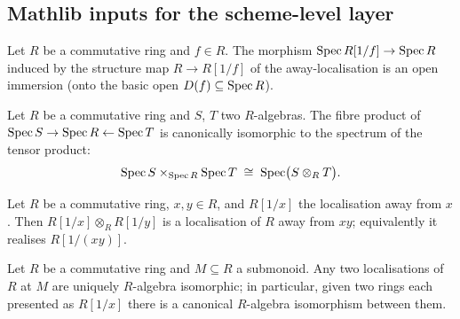 \subsection*{Mathlib inputs for the scheme-level layer}

\begin{lemma}
  \label{mk-lem:mathlib_specMap_localizationAway_isOpenImmersion}
  \mathlibok

  Let \(R\) be a commutative ring and \(f \in R\). The morphism
  \(\operatorname{Spec} R[1/f] \to \operatorname{Spec} R\) induced by the structure map \(R \to R[1/f]\) of
  the away-localisation is an open immersion (onto the basic open
  \(D(f) \subseteq \operatorname{Spec} R\)).
\end{lemma}

\begin{lemma}
  \label{mk-lem:mathlib_pullbackSpecIso}
  \mathlibok

  Let \(R\) be a commutative ring and \(S\), \(T\) two \(R\)-algebras. The fibre
  product of \(\operatorname{Spec} S \to \operatorname{Spec} R \leftarrow \operatorname{Spec} T\) is canonically isomorphic
  to the spectrum of the tensor product:
  \[
    \operatorname{Spec} S \times_{\operatorname{Spec} R} \operatorname{Spec} T \;\cong\; \operatorname{Spec}\bigl(S \otimes_R T\bigr).
  \]
\end{lemma}

\begin{lemma}
  \label{mk-lem:mathlib_isLocalization_away_mul}
  \mathlibok

  Let \(R\) be a commutative ring, \(x, y \in R\), and \(R[1/x]\) the localisation
  away from \(x\). Then \(R[1/x] \otimes_R R[1/y]\) is a localisation of \(R\)
  away from \(x y\); equivalently it realises \(R[1/(xy)]\).
\end{lemma}

\begin{lemma}
  \label{mk-lem:mathlib_isLocalization_algEquiv}
  \mathlibok

  Let \(R\) be a commutative ring and \(M \subseteq R\) a submonoid. Any two
  localisations of \(R\) at \(M\) are uniquely \(R\)-algebra isomorphic; in
  particular, given two rings each presented as \(R[1/x]\) there is a canonical
  \(R\)-algebra isomorphism between them.
\end{lemma}

